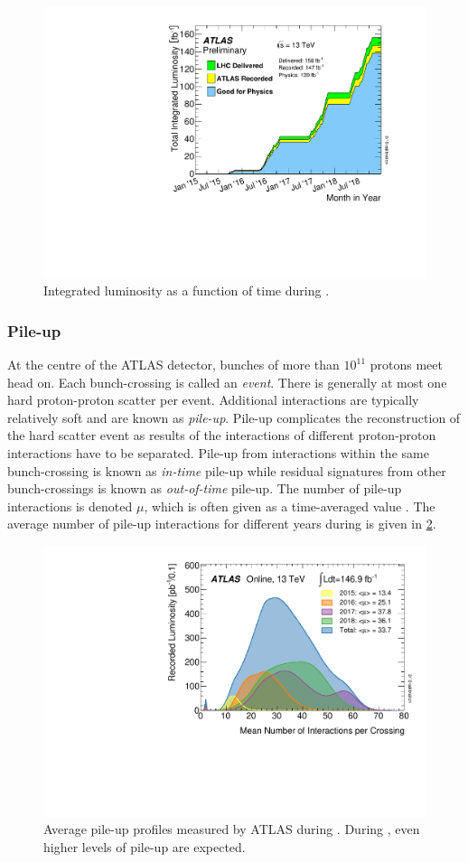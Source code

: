 %
\begin{figure}[!htbp]
  \centering
  \includegraphics[width=0.6\linewidth]{chapters/2.detector/figs/intlumivstimeRun2DQall.pdf}
  \caption{
    Integrated luminosity as a function of time during \runtwo \cite{atlas-lumi-run2}.
  }
  \label{fig:run2_lumi}
\end{figure}
%


\subsubsection{Pile-up}

At the centre of the ATLAS detector, bunches of more than $10^{11}$ protons meet head on.
Each bunch-crossing is called an \textit{event}.
There is generally at most one hard proton-proton scatter per event.
Additional interactions are typically relatively soft and are known as \textit{pile-up}.
Pile-up complicates the reconstruction of the hard scatter event as results of the interactions of different proton-proton interactions have to be separated.
Pile-up from interactions within the same bunch-crossing is known as \textit{in-time} pile-up while residual signatures from other bunch-crossings is known as \textit{out-of-time} pile-up.
The number of pile-up interactions is denoted $\mu$, which is often given as a time-averaged value \angles{\mu}.
The average number of pile-up interactions for different years during \runtwo is given in \cref{fig:run2_pile-up}.
%
\begin{figure}[!htbp]
  \centering
  \includegraphics[width=0.6\linewidth]{chapters/2.detector/figs/mu_2015_2018.pdf}
  \caption{
    Average pile-up profiles measured by ATLAS during \runtwo \cite{atlas-lumi-run2}.
    During \runthree, even higher levels of pile-up are expected.
  }
  \label{fig:run2_pile-up}
\end{figure}
%


